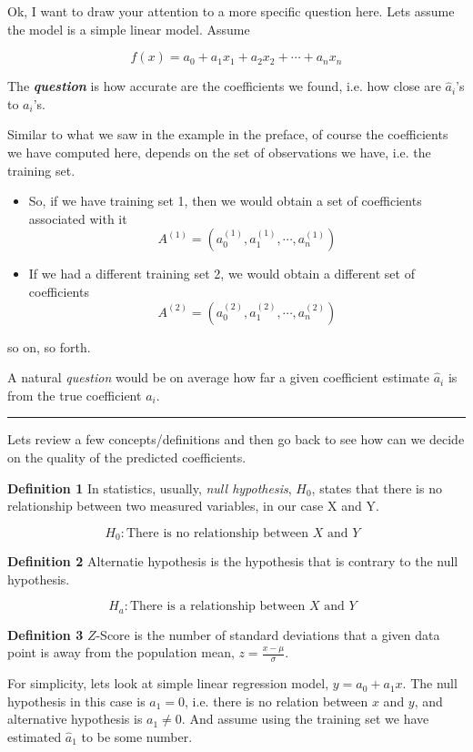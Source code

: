 \documentclass[11pt]{article}
\begin{document}
Ok, I want to draw your attention to a more specific question here. Lets
assume the model is a simple linear model. Assume

\[ f(x) =  a_0 + a_1 x_1 + a_2 x_2 + \cdots + a_n x_n \tag{6} \]

The \textbf{\emph{question}} is how accurate are the coefficients we
found, i.e. how close are $\hat{a}_i$'s to $a_i$'s.

    Similar to what we saw in the example in the preface, of course the
coefficients we have computed here, depends on the set of observations
we have, i.e. the training set.

\begin{itemize}
\item
  So, if we have training set 1, then we would obtain a set of
  coefficients associated with it
  \[A^{(1)}=(a_0^{(1)}, a_1^{(1)}, \cdots, a_n^{(1)})\]
\item
  If we had a different training set 2, we would obtain a different set
  of coefficients \[A^{(2)}=(a_0^{(2)}, a_1^{(2)}, \cdots, a_n^{(2)})\]
\end{itemize}

so on, so forth.

A natural \emph{question} would be on average how far a given
coefficient estimate $\hat{a}_i$ is from the true coefficient $a_i$.

\begin{center}\rule{0.5\linewidth}{\linethickness}\end{center}

Lets review a few concepts/definitions and then go back to see how can
we decide on the quality of the predicted coefficients.

\textbf{Definition 1} In statistics, usually, \emph{null hypothesis},
\textbf{$H_0$}, states that there is no relationship between two
measured variables, in our case X and Y.

\[H_0: \text{There is no relationship between $X$ and $Y$ }\]

\textbf{Definition 2} Alternatie hypothesis is the hypothesis that is
contrary to the null hypothesis.

\[H_a: \text{There is a relationship between $X$ and $Y$ }\]

\textbf{Definition 3} $Z$-Score is the number of standard deviations
that a given data point is away from the population mean,
$z = \frac{x-\mu}{\sigma}$.

    For simplicity, lets look at simple linear regression model,
$y=a_0 + a_1x$. The null hypothesis in this case is $a_1=0$, i.e.
there is no relation between $x$ and $y$, and alternative hypothesis
is $a_1 \neq 0$. And assume using the training set we have estimated
$\hat{a}_1$ to be some number.
\end{document}
